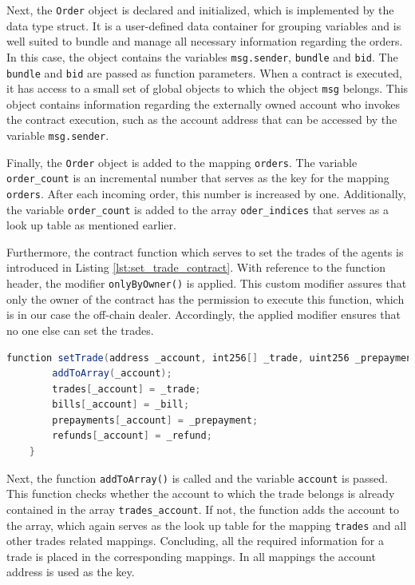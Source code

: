 Next, the \verb|Order| object is declared and initialized, which is implemented by the data type
struct. It is a user-defined data container for grouping variables and is well suited to bundle and 
manage all necessary information regarding the orders.
In this case, the object contains the variables \verb|msg.sender|, \verb|bundle| and \verb|bid|.
The \verb|bundle| and \verb|bid| are passed as function parameters.
When a contract is executed, it has access to a small set of global objects to which the object \verb|msg| belongs.
This object contains information regarding the externally owned account who invokes the contract execution,
such as the account address that can be accessed by the variable \verb|msg.sender|.

Finally, the \verb|Order| object is added to the mapping \verb|orders|.
The variable \verb|order_count| is an incremental number that serves as the key for 
the mapping \verb|orders|. After each incoming order, this number is increased by one. 
Additionally, the variable \verb|order_count| is added to the array \verb|oder_indices|
that serves as a look up table as mentioned earlier.

Furthermore, the contract function which serves to set the trades of the agents is introduced in Listing \ref{lst:set_trade_contract}.
With reference to the function header, the modifier \verb|onlyByOwner()| is applied.
This custom modifier assures that only the owner of the contract has the permission to execute 
this function, which is in our case the off-chain dealer. Accordingly, the applied 
modifier ensures that no one else can set the trades. 

\begin{lstlisting}[float=htbp, label=lst:set_trade_contract, caption=Setting the trades, language=Java]
    function setTrade(address _account, int256[] _trade, uint256 _prepayment, uint256 _bill, uint256 _refund) public onlyByOwner() {
        addToArray(_account);
        trades[_account] = _trade;
        bills[_account] = _bill;
        prepayments[_account] = _prepayment;
        refunds[_account] = _refund;
    }
\end{lstlisting}

Next, the function \verb|addToArray()| is called and the variable \verb|account| is passed. 
This function checks whether the account to which the trade belongs is already contained in the array \verb|trades_account|.
If not, the function adds the account to the array, which again serves as the look up table for the
mapping \verb|trades| and all other trades related mappings.
Concluding, all the required information for a trade is placed in the corresponding mappings. In all
mappings the account address is used as the key.

